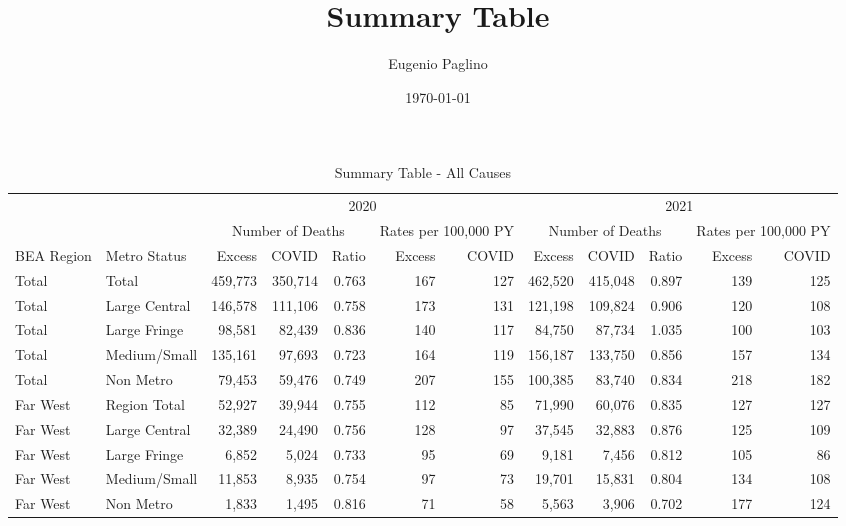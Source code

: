 \documentclass[
]{article}
\title{Summary Table}
\author{Eugenio Paglino}
\date{\today}
\begin{document}
\maketitle

\begin{table}

\caption{\label{tab:unnamed-chunk-8}Summary Table - All Causes}
\centering
\fontsize{7.5}{9.5}\selectfont
\begin{tabular}[t]{llrrrrrrrrrr}
\toprule
\multicolumn{2}{c}{ } & \multicolumn{5}{c}{2020} & \multicolumn{5}{c}{2021} \\
\cmidrule(l{3pt}r{3pt}){3-7} \cmidrule(l{3pt}r{3pt}){8-12}
\multicolumn{2}{c}{ } & \multicolumn{3}{c}{Number of Deaths} & \multicolumn{2}{c}{Rates per 100,000 PY} & \multicolumn{3}{c}{Number of Deaths} & \multicolumn{2}{c}{Rates per 100,000 PY} \\
\cmidrule(l{3pt}r{3pt}){3-5} \cmidrule(l{3pt}r{3pt}){6-7} \cmidrule(l{3pt}r{3pt}){8-10} \cmidrule(l{3pt}r{3pt}){11-12}
BEA Region & Metro Status & Excess & COVID & Ratio & Excess & COVID & Excess & COVID & Ratio & Excess & COVID\\
\midrule
Total & Total & 459,773 & 350,714 & 0.763 & 167 & 127 & 462,520 & 415,048 & 0.897 & 139 & 125\\
\addlinespace[2pt]
Total & Large Central & 146,578 & 111,106 & 0.758 & 173 & 131 & 121,198 & 109,824 & 0.906 & 120 & 108\\
Total & Large Fringe & 98,581 & 82,439 & 0.836 & 140 & 117 & 84,750 & 87,734 & 1.035 & 100 & 103\\
Total & Medium/Small & 135,161 & 97,693 & 0.723 & 164 & 119 & 156,187 & 133,750 & 0.856 & 157 & 134\\
Total & Non Metro & 79,453 & 59,476 & 0.749 & 207 & 155 & 100,385 & 83,740 & 0.834 & 218 & 182\\
\addlinespace[5pt]
Far West & Region Total & 52,927 & 39,944 & 0.755 & 112 & 85 & 71,990 & 60,076 & 0.835 & 127 & 127\\
\addlinespace[2pt]
Far West & Large Central & 32,389 & 24,490 & 0.756 & 128 & 97 & 37,545 & 32,883 & 0.876 & 125 & 109\\
Far West & Large Fringe & 6,852 & 5,024 & 0.733 & 95 & 69 & 9,181 & 7,456 & 0.812 & 105 & 86\\
Far West & Medium/Small & 11,853 & 8,935 & 0.754 & 97 & 73 & 19,701 & 15,831 & 0.804 & 134 & 108\\
Far West & Non Metro & 1,833 & 1,495 & 0.816 & 71 & 58 & 5,563 & 3,906 & 0.702 & 177 & 124\\

\end{tabular}
\end{table}
\end{document}
